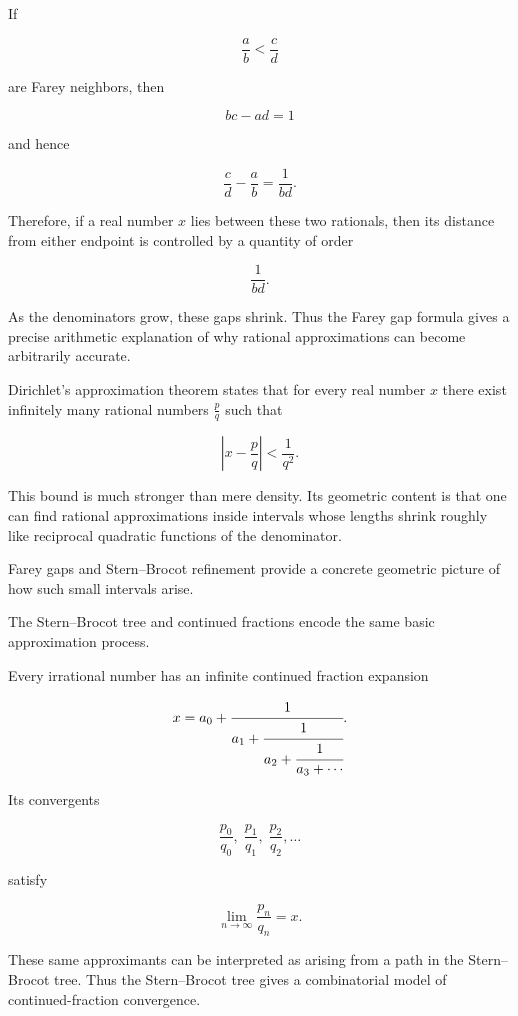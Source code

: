 \begin{remark}
If

\[
\frac{a}{b} < \frac{c}{d}
\]

are Farey neighbors, then

\[
bc-ad=1
\]

and hence

\[
\frac{c}{d}-\frac{a}{b}=\frac{1}{bd}.
\]

Therefore, if a real number $x$ lies between these two rationals, then
its distance from either endpoint is controlled by a quantity of order

\[
\frac{1}{bd}.
\]

As the denominators grow, these gaps shrink.  Thus the Farey gap formula
gives a precise arithmetic explanation of why rational approximations
can become arbitrarily accurate.
\end{remark}


\begin{remark}
Dirichlet's approximation theorem states that for every real number $x$
there exist infinitely many rational numbers $\frac{p}{q}$ such that

\[
\left|x-\frac{p}{q}\right| < \frac{1}{q^2}.
\]

This bound is much stronger than mere density.  Its geometric content is
that one can find rational approximations inside intervals whose lengths
shrink roughly like reciprocal quadratic functions of the denominator.

Farey gaps and Stern--Brocot refinement provide a concrete geometric
picture of how such small intervals arise.
\end{remark}


\begin{remark}
The Stern--Brocot tree and continued fractions encode the same basic
approximation process.

Every irrational number has an infinite continued fraction expansion

\[
x
=
a_0 +
\cfrac{1}{a_1 +
\cfrac{1}{a_2 +
\cfrac{1}{a_3 + \cdots}}}.
\]

Its convergents

\[
\frac{p_0}{q_0},\;
\frac{p_1}{q_1},\;
\frac{p_2}{q_2},\dots
\]

satisfy

\[
\lim_{n\to\infty}\frac{p_n}{q_n}=x.
\]

These same approximants can be interpreted as arising from a path in
the Stern--Brocot tree.  Thus the Stern--Brocot tree gives a
combinatorial model of continued-fraction convergence.
\end{remark}


